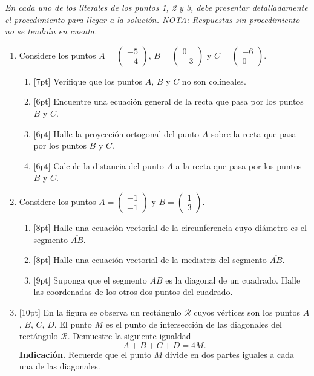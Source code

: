 \documentclass[11pt]{article}
\newcommand{\vect}[2]{\begin{pmatrix}#1\\#2\end{pmatrix}}
\newcommand{\nota}[1]{{\small\itshape\color{unalblue!70!black} #1}}
\begin{document}
\vspace{6pt}
\nota{En cada uno de los literales de los puntos 1, 2 y 3, debe presentar detalladamente el procedimiento para llegar a la solución. NOTA: Respuestas sin procedimiento no se tendrán en cuenta.}

\begin{enumerate}
\item Considere los puntos $A=\vect{-5}{-4}$, $B=\vect{0}{-3}$ y $C=\vect{-6}{0}$.

\begin{enumerate}[label=(\alph*)]
\item{}[7pt] Verifique que los puntos $A$, $B$ y $C$ no son colineales.
\item{}[6pt] Encuentre una ecuación general de la recta que pasa por los puntos $B$ y $C$.
\item{}[6pt] Halle la proyección ortogonal del punto $A$ sobre la recta que pasa por los puntos $B$ y $C$.
\item{}[6pt] Calcule la distancia del punto $A$ a la recta que pasa por los puntos $B$ y $C$.
\end{enumerate}

\item Considere los puntos $A=\vect{-1}{-1}$ y $B=\vect{1}{3}$.

\begin{enumerate}[label=(\alph*)]
\item{}[8pt] Halle una ecuación vectorial de la circunferencia cuyo diámetro es el segmento $\overline{AB}$.
\item{}[8pt] Halle una ecuación vectorial de la mediatriz del segmento $\overline{AB}$.
\item{}[9pt] Suponga que el segmento $\overline{AB}$ es la diagonal de un cuadrado. Halle las coordenadas de los otros dos puntos del cuadrado.
\end{enumerate}

\item{}[10pt] En la figura se observa un rectángulo $\mathcal{R}$ cuyos vértices son los puntos $A$, $B$, $C$, $D$. El punto $M$ es el punto de intersección de las diagonales del rectángulo $\mathcal{R}$. Demuestre la siguiente igualdad
$$A+B+C+D=4M.$$
\textbf{Indicación.} Recuerde que el punto $M$ divide en dos partes iguales a cada una de las diagonales.

\begin{center}
\end{center}
\end{enumerate}
\end{document}
